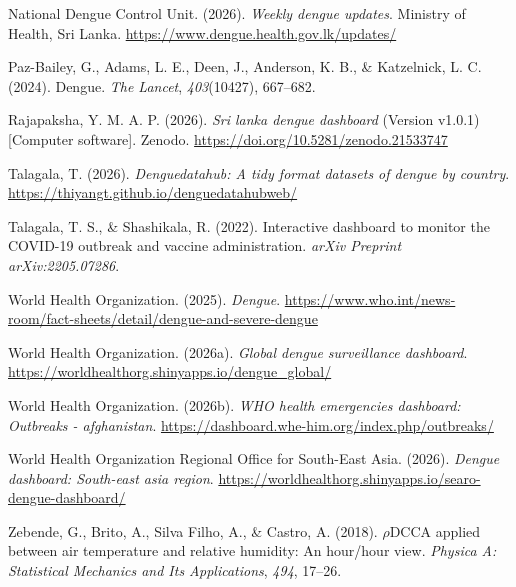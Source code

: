 \documentclass[
]{article}
\newlength{\cslhangindent}
\newenvironment{CSLReferences}[2] %
 {\begin{list}{}{%
  \setlength{\itemindent}{0pt}
  \setlength{\leftmargin}{0pt}
  \setlength{\parsep}{0pt}
  \ifodd #1
   \setlength{\leftmargin}{\cslhangindent}
   \setlength{\itemindent}{-1\cslhangindent}
  \fi
  \setlength{\itemsep}{#2\baselineskip}}}
 {\end{list}}
\begin{document}
\begin{CSLReferences}{1}{0}
National Dengue Control Unit. (2026). \emph{Weekly dengue updates}.
Ministry of Health, Sri Lanka.
\url{https://www.dengue.health.gov.lk/updates/}

Paz-Bailey, G., Adams, L. E., Deen, J., Anderson, K. B., \& Katzelnick,
L. C. (2024). Dengue. \emph{The Lancet}, \emph{403}(10427), 667--682.

Rajapaksha, Y. M. A. P. (2026). \emph{Sri lanka dengue dashboard}
(Version v1.0.1) {[}Computer software{]}. Zenodo.
\url{https://doi.org/10.5281/zenodo.21533747}

Talagala, T. (2026). \emph{Denguedatahub: A tidy format datasets of
dengue by country}. \url{https://thiyangt.github.io/denguedatahubweb/}

Talagala, T. S., \& Shashikala, R. (2022). Interactive dashboard to
monitor the COVID-19 outbreak and vaccine administration. \emph{arXiv
Preprint arXiv:2205.07286}.

World Health Organization. (2025). \emph{Dengue}.
\url{https://www.who.int/news-room/fact-sheets/detail/dengue-and-severe-dengue}

World Health Organization. (2026a). \emph{Global dengue surveillance
dashboard}. \url{https://worldhealthorg.shinyapps.io/dengue_global/}

World Health Organization. (2026b). \emph{WHO health emergencies
dashboard: Outbreaks - afghanistan}.
\url{https://dashboard.whe-him.org/index.php/outbreaks/}

World Health Organization Regional Office for South-East Asia. (2026).
\emph{Dengue dashboard: South-east asia region}.
\url{https://worldhealthorg.shinyapps.io/searo-dengue-dashboard/}

Zebende, G., Brito, A., Silva Filho, A., \& Castro, A. (2018).
\(\rho\)DCCA applied between air temperature and relative humidity: An
hour/hour view. \emph{Physica A: Statistical Mechanics and Its
Applications}, \emph{494}, 17--26.

\end{CSLReferences}
\end{document}
